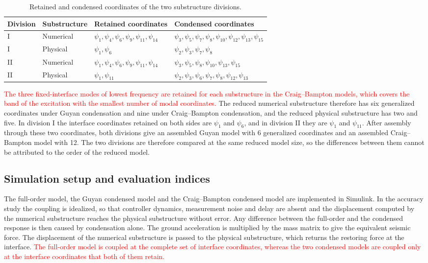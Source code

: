 \documentclass[11pt,a4paper]{article}
\numberwithin{equation}{section}
\newcommand{\rev}[1]{\textcolor{red}{#1}}
\begin{document}
\begin{table}[htbp]
	\centering
	\caption{Retained and condensed coordinates of the two substructure divisions.}
	\label{tab:dof-sets}
	\begin{tabular}{llll}
		\toprule
		Division & Substructure & Retained coordinates & Condensed coordinates\\
		\midrule
		I  & Numerical & \(\psi_{1},\psi_{4},\psi_{6},\psi_{9},\psi_{11},\psi_{14}\)
		& \(\psi_{3},\psi_{5},\psi_{7},\psi_{8},\psi_{10},\psi_{12},\psi_{13},\psi_{15}\)\\
		I  & Physical  & \(\psi_{1},\psi_{6}\)
		& \(\psi_{2},\psi_{3},\psi_{7},\psi_{8}\)\\
		\midrule
		II & Numerical & \(\psi_{1},\psi_{4},\psi_{6},\psi_{9},\psi_{11},\psi_{14}\)
		& \(\psi_{3},\psi_{5},\psi_{8},\psi_{10},\psi_{13},\psi_{15}\)\\
		II & Physical  & \(\psi_{1},\psi_{11}\)
		& \(\psi_{2},\psi_{3},\psi_{6},\psi_{7},\psi_{8},\psi_{12},\psi_{13}\)\\
		\bottomrule
	\end{tabular}
\end{table}

\rev{The three fixed-interface modes of lowest frequency are retained for each substructure in the Craig--Bampton models, which covers the band of the excitation with the smallest number of modal coordinates.} The reduced numerical substructure therefore has six generalized coordinates under Guyan condensation and nine under Craig--Bampton condensation, and the reduced physical substructure has two and five. In division I the interface coordinates retained on both sides are \(\psi_{1}\) and \(\psi_{6}\), and in division II they are \(\psi_{1}\) and \(\psi_{11}\). After assembly through these two coordinates, both divisions give an assembled Guyan model with 6 generalized coordinates and an assembled Craig--Bampton model with 12. The two divisions are therefore compared at the same reduced model size, so the differences between them cannot be attributed to the order of the reduced model.

\subsection{Simulation setup and evaluation indices}
\label{sec:setup}

The full-order model, the Guyan condensed model and the Craig--Bampton condensed model are implemented in Simulink. In the accuracy study the coupling is idealized, so that controller dynamics, measurement noise and delay are absent and the displacement computed by the numerical substructure reaches the physical substructure without error. Any difference between the full-order and the condensed response is then caused by condensation alone. The ground acceleration is multiplied by the mass matrix to give the equivalent seismic force. The displacement of the numerical substructure is passed to the physical substructure, which returns the restoring force at the interface. \rev{The full-order model is coupled at the complete set of interface coordinates, whereas the two condensed models are coupled only at the interface coordinates that both of them retain.}
\end{document}
